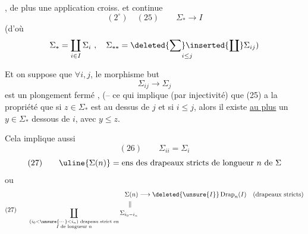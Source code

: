 ,  de plus une application croiss. et continue
\[
(2^\circ)\quad (25)\qquad \Sigma_*\longrightarrow I
\]
(d'où
\[
\Sigma_*=\coprod_{i\in I}\Sigma_i\ ,\quad
\Sigma_{**}=\underset{i\leq j}{\deleted{\sum}\inserted{\coprod}}\Sigma_{ij})
\]

Et on  suppose que $\forall i,j$,  le morphisme but
\[
\Sigma_{ij}\longrightarrow\Sigma_j
\]
est un  plongement fermé , (-- ce qui implique (par injectivité) que (25\unsure{$^*$|$^\circ$}) a la propriété que si $z\in\Sigma_*$ est au dessus de $j$ et si $i\leq j$, alors il existe \uline{au plus} un $y\in\Sigma_*$  dessous de $i$, avec $y\leq z$.

Cela implique aussi
\[
(26)\qquad\Sigma_{ii}=\Sigma_i
\]
\[
(27)\qquad \uline{\Sigma(n)}=\text{ens des drapeaux stricts de longueur }n\text{ de }\Sigma
\]
ou
\[
(27)\qquad
\begin{aligned}
\Sigma(n)&\longrightarrow\deleted{\unsure{I}}\operatorname{Drap}_n(I)\quad\text{(drapeaux stricts)}\\
\Vert\quad&\\[-1ex]
\coprod_{\substack{(i_0<\unsure{\cdots}<i_n)\text{ drapeau strict en}\\ I\text{ de longueur }n}}\Sigma_{i_0- i_n}&
\end{aligned}
\]
